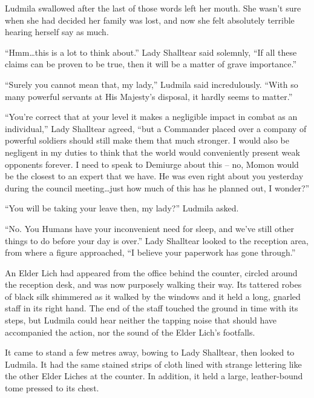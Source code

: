  

Ludmila swallowed after the last of those words left her mouth. She wasn’t sure when she had decided her family was lost, and now she felt absolutely terrible hearing herself say as much.

 

“Hmm…this is a lot to think about.” Lady Shalltear said solemnly, “If all these claims can be proven to be true, then it will be a matter of grave importance.”

 

“Surely you cannot mean that, my lady,” Ludmila said incredulously. “With so many powerful servants at His Majesty’s disposal, it hardly seems to matter.”

 

“You’re correct that at your level it makes a negligible impact in combat as an individual,” Lady Shalltear agreed, “but a Commander placed over a company of powerful soldiers should still make them that much stronger. I would also be negligent in my duties to think that the world would conveniently present weak opponents forever. I need to speak to Demiurge about this – no, Momon would be the closest to an expert that we have. He was even right about you yesterday during the council meeting…just how much of this has he planned out, I wonder?”

 

“You will be taking your leave then, my lady?” Ludmila asked.

 

“No. You Humans have your inconvenient need for sleep, and we’ve still other things to do before your day is over.” Lady Shalltear looked to the reception area, from where a figure approached, “I believe your paperwork has gone through.”

 

An Elder Lich had appeared from the office behind the counter, circled around the reception desk, and was now purposely walking their way. Its tattered robes of black silk shimmered as it walked by the windows and it held a long, gnarled staff in its right hand. The end of the staff touched the ground in time with its steps, but Ludmila could hear neither the tapping noise that should have accompanied the action, nor the sound of the Elder Lich’s footfalls.

 

It came to stand a few metres away, bowing to Lady Shalltear, then looked to Ludmila. It had the same stained strips of cloth lined with strange lettering like the other Elder Liches at the counter. In addition, it held a large, leather-bound tome pressed to its chest.

